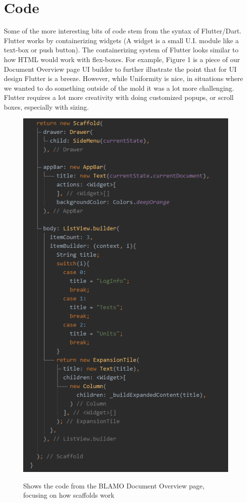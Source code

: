 \documentclass[onecolumn, draftclsnofoot,10pt, compsoc]{IEEEtran}
\begin{document}
\section{Code}
Some of the more interesting bits of code stem from the syntax of Flutter/Dart. Flutter works by containerizing widgets (A widget is a small U.I. module like a text-box or push button). The containerizing system of Flutter looks similar to how HTML would work with flex-boxes. For example, Figure 1 is a piece of our Document Overview page UI builder to further illustrate the point that for UI design Flutter is a breeze. However, while Uniformity is nice, in situations where we wanted to do something outside of the mold it was a lot more challenging. Flutter requires a lot more creativity with doing customized popups, or scroll boxes, especially with sizing.
\begin{figure}[!htb]
    \centering
    \includegraphics[scale=0.5]{Images/Capture.PNG}
    \label{Fig 1.}
    \caption{ Shows the code from the BLAMO Document Overview page, focusing on how scaffolds work}
\end{figure}
\end{document}
